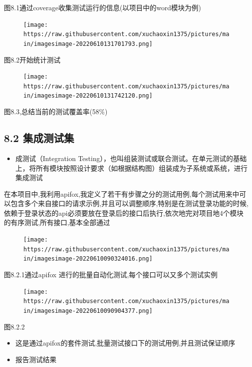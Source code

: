 \documentclass[
]{article}
\begin{document}
图8.1通过coverage收集测试运行的信息(以项目中的word模块为例)

\begin{figure}
\centering
\texttt{[image: https://raw.githubusercontent.com/xuchaoxin1375/pictures/main/imagesimage-20220610131701793.png]}
\caption{}
\end{figure}

图8.2开始统计测试

\begin{figure}
\centering
\texttt{[image: https://raw.githubusercontent.com/xuchaoxin1375/pictures/main/imagesimage-20220610131742120.png]}
\caption{}
\end{figure}

图8.3,总结当前的测试覆盖率(58\%)

\hypertarget{82-ux96c6ux6210ux6d4bux8bd5ux96c6}{%
\subsection{8.2 集成测试集}\label{82-ux96c6ux6210ux6d4bux8bd5ux96c6}}

\begin{itemize}
\item
  成测试（Integration
  Testing），也叫组装测试或联合测试。在单元测试的基础上，将所有模块按照设计要求（如根据结构图）组装成为子系统或系统，进行集成测试
\end{itemize}

在本项目中,我利用apifox,我定义了若干有步骤之分的测试用例,每个测试用来中可以包含多个来自接口的请求示例,并且可以调整顺序,特别是在测试登录功能的时候,依赖于登录状态的api必须要放在登录后的接口后执行,依次地完对项目地4个模块的有序测试,所有接口,基本全部通过

\begin{figure}
\centering
\texttt{[image: https://raw.githubusercontent.com/xuchaoxin1375/pictures/main/imagesimage-20220610090324016.png]}
\caption{}
\end{figure}

图8.2.1通过apifox 进行的批量自动化测试,每个接口可以又多个测试实例

\begin{figure}
\centering
\texttt{[image: https://raw.githubusercontent.com/xuchaoxin1375/pictures/main/imagesimage-20220610090904377.png]}
\caption{}
\end{figure}

图8.2.2

\begin{itemize}
\item
  这是通过apifox的套件测试,批量测试接口下的测试用例,并且测试保证顺序
\item
  报告测试结果
\end{itemize}
\end{document}
